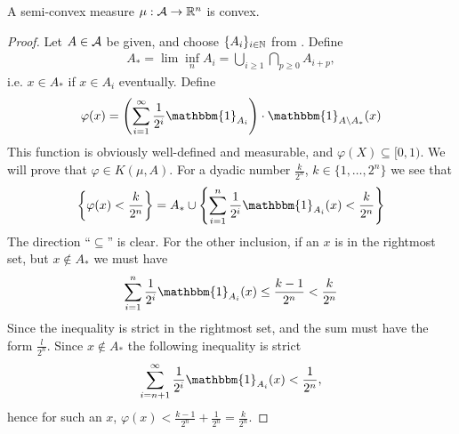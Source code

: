 \begin{lemma}\label{thm: semi-convex implies convex}
A semi-convex measure $\mu:\mathcal{A} \to \mathbb{R}^{n}$ is convex.
\end{lemma}
\begin{proof}
Let $A\in \mathcal{A}$ be given, and choose $\{A_{i}\}_{i\in \mathbb{N}}$ from .
Define
\begin{align*}
	A_{*}=\lim \inf_{n} A_{i} = \bigcup_{i\ge 1} \bigcap_{p\ge 0} A_{i+p},
\end{align*}
i.e. $x\in A_{*}$ if $x\in A_{i}$ eventually. Define
\begin{align*}
	\varphi(x)=\left( \sum_{i=1}^{\infty} \frac{1}{2^{i}}\mathbbm{1}_{A_{i}} \right) \cdot \mathbbm{1}_{A\setminus A_{*}}(x)
\end{align*}
This function is obviously well-defined and measurable, and $\varphi(X) \subseteq [0,1)$.
We will prove that $\varphi\in K(\mu, A)$. For a dyadic number $\frac{k}{2^{n}}$, $k\in \{1, \dots, 2^{n} \}$ we see that
\begin{align*}
	\left\{ \varphi(x) < \frac{k}{2^{n}} \right\} = A_{*} \cup \left\{ \sum_{i=1}^{n} \frac{1}{2^{i}}\mathbbm{1}_{A_{i}}(x) < \frac{k}{2^{n}} \right\}
\end{align*}
The direction ``$\subseteq$'' is clear.
For the other inclusion, if an $x$ is in the rightmost set, but $x\not\in A_{*}$ we must have
\begin{align*}
	\sum_{i=1}^{n}\frac{1}{2^{i}}\mathbbm{1}_{A_{i}}(x)\le \frac{k-1}{2^{n}}<\frac{k}{2^{n}}
\end{align*}
Since the inequality is strict in the rightmost set, and the sum must have the form $\frac{l}{2^{n}}$. Since $x\not\in A_{*}$ the following inequality is strict
\begin{align*}
	\sum_{i=n+1}^{\infty} \frac{1}{2^{i}}\mathbbm{1}_{A_{i}}(x) < \frac{1}{2^{n}},
\end{align*}
hence for such an $x$, $\varphi(x) < \frac{k-1}{2^{n}}+\frac{1}{2^{n}}=\frac{k}{2^{n}}$.


\end{proof}
